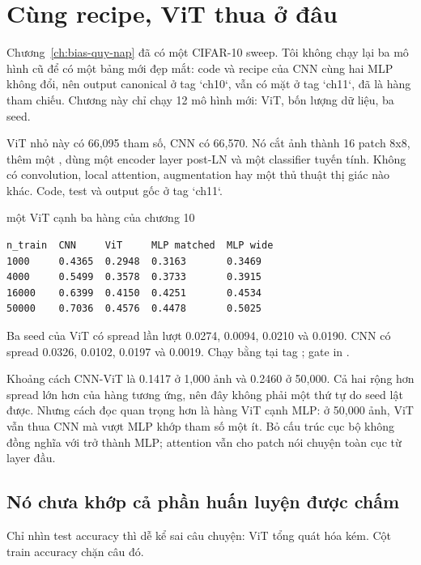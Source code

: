\section{Cùng recipe, ViT thua ở đâu}
\label{sec:ch11-cung-recipe}

%
Chương~\ref{ch:bias-quy-nap} đã có một CIFAR-10 sweep. Tôi không chạy lại ba
mô hình cũ để có một bảng mới đẹp mắt: code và recipe của CNN cùng hai MLP
không đổi, nên output canonical ở tag `ch10`, vẫn có mặt ở tag `ch11`, đã là
hàng tham chiếu. Chương này chỉ chạy 12 mô hình mới: ViT, bốn lượng dữ liệu,
ba seed.

ViT nhỏ này có 66,095 tham số, CNN có 66,570. Nó cắt ảnh thành 16 patch 8x8,
thêm một , dùng một encoder layer post-LN và một classifier tuyến
tính. Không có convolution, local attention, augmentation hay một thủ thuật
thị giác nào khác. Code, test và output gốc ở tag `ch11`.

\begin{measured}{một ViT cạnh ba hàng của chương 10}
\begin{verbatim}
n_train  CNN     ViT     MLP matched  MLP wide
1000     0.4365  0.2948  0.3163       0.3469
4000     0.5499  0.3578  0.3733       0.3915
16000    0.6399  0.4150  0.4251       0.4534
50000    0.7036  0.4576  0.4478       0.5025
\end{verbatim}

Ba seed của ViT có spread lần lượt 0.0274, 0.0094, 0.0210 và 0.0190. CNN có
spread 0.0326, 0.0102, 0.0197 và 0.0019. Chạy bằng
 tại tag ; gate in
.
\end{measured}

Khoảng cách CNN-ViT là 0.1417 ở 1,000 ảnh và 0.2460 ở 50,000. Cả hai rộng hơn
spread lớn hơn của hàng tương ứng, nên đây không phải một thứ tự do seed lật
được. Nhưng cách đọc quan trọng hơn là hàng ViT cạnh MLP: ở 50,000 ảnh, ViT
vẫn thua CNN mà vượt MLP khớp tham số một ít. Bỏ cấu trúc cục bộ không đồng
nghĩa với trở thành MLP; attention vẫn cho patch nói chuyện toàn cục từ layer
đầu.

\subsection*{Nó chưa khớp cả phần huấn luyện được chấm}

Chỉ nhìn test accuracy thì dễ kể sai câu chuyện: ViT tổng quát hóa kém. Cột
train accuracy chặn câu đó.

